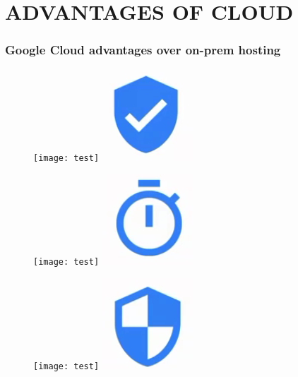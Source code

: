 \documentclass[c]{beamer}
\begin{document}
   \section{ADVANTAGES OF CLOUD}
    	\begin{frame}
		\frametitle{Google Cloud advantages over on-prem hosting}
		\begin{figure}[ht]
  {\begin{minipage}[t]{90pt}
  \begin{center}
    \texttt{[image: test]}
    \includegraphics[scale=.4]{images/18a.png}\newline
    \end{center}
  \end{minipage}}
  \hfill
  {\begin{minipage}[t]{71.5pt}
  \begin{center}
    \texttt{[image: test]}
    \includegraphics[scale=.4]{images/18b.png}\newline
    \end{center}
  \end{minipage}}
  {\begin{minipage}[t]{71.5pt}
  \begin{center}
    \texttt{[image: test]}
     \includegraphics[scale=.4]{images/18c.png}\newline

\end{center}
\end{minipage}}
\end{figure}
\end{frame}
\end{document}
